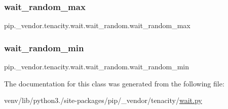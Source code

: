 \subsubsection{\texorpdfstring{wait\+\_\+random\+\_\+max}{wait\_random\_max}}
{\footnotesize\ttfamily pip.\+\_\+vendor.\+tenacity.\+wait.\+wait\+\_\+random.\+wait\+\_\+random\+\_\+max}

\mbox{\label{classpip_1_1__vendor_1_1tenacity_1_1wait_1_1wait__random_a50687544554fab2de2d832021d0770c6}} 
\subsubsection{\texorpdfstring{wait\+\_\+random\+\_\+min}{wait\_random\_min}}
{\footnotesize\ttfamily pip.\+\_\+vendor.\+tenacity.\+wait.\+wait\+\_\+random.\+wait\+\_\+random\+\_\+min}



The documentation for this class was generated from the following file\+:\begin{DoxyCompactItemize}
\item 
venv/lib/python3./site-\/packages/pip/\+\_\+vendor/tenacity/\hyperlink{tenacity_2wait_8py}{wait.\+py}\end{DoxyCompactItemize}

